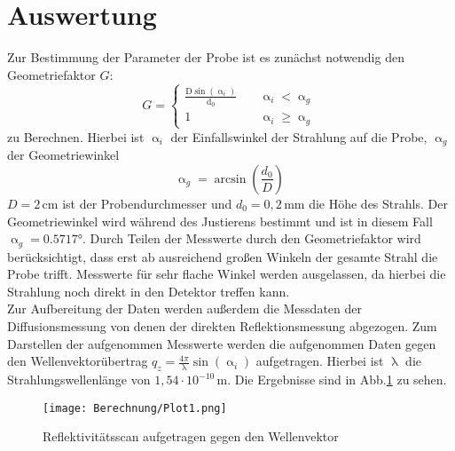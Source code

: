 \section{Auswertung}
Zur Bestimmung der Parameter der Probe ist es zunächst notwendig den Geometriefaktor $G$:
\begin{equation}
  G =
     \begin{cases}
       \frac{\text{D}\sin\left(\upalpha_i\right)}{\text{d}_0} &\quad\upalpha_i<\upalpha_g\\
       1 &\quad\upalpha_i\geq\upalpha_g
     \end{cases}
\end{equation}
zu Berechnen. Hierbei ist $\upalpha_i$ der Einfallswinkel der Strahlung auf die Probe, $\upalpha_g$ der Geometriewinkel
\begin{equation}
\upalpha_g=\arcsin(\frac{d_0}{D})\,
\end{equation}
$D=2\,\si{\cm}$ ist der Probendurchmesser und $d_0=0{,}2\,\si{\mm}$ die Höhe des Strahls. Der Geometriewinkel wird während des Justierens bestimmt und ist in diesem Fall $\upalpha_g=0.5717°$.
Durch Teilen der Messwerte durch den Geometriefaktor wird berücksichtigt, dass erst ab ausreichend großen Winkeln der gesamte Strahl die Probe trifft. Messwerte für sehr flache Winkel werden ausgelassen, da hierbei die Strahlung noch direkt in den Detektor treffen kann.\\
Zur Aufbereitung der Daten werden außerdem die Messdaten der Diffusionsmessung von denen der direkten Reflektionsmessung abgezogen. Zum Darstellen der aufgenommen Messwerte werden die aufgenommen Daten gegen den Wellenvektorübertrag $q_z=\frac{4\pi}{\uplambda}\sin(\upalpha_i)$ aufgetragen. Hierbei ist $\uplambda$ die Strahlungswellenlänge von $1{,}54\cdot10^{-10}\,\si{\m}$. Die Ergebnisse sind in Abb.\ref{Plot1} zu sehen.
\begin{figure}[H]
  \centering
  \texttt{[image: Berechnung/Plot1.png]}
  \caption{Reflektivitätsscan aufgetragen gegen den Wellenvektor}
  \label{Plot1}
\end{figure}
